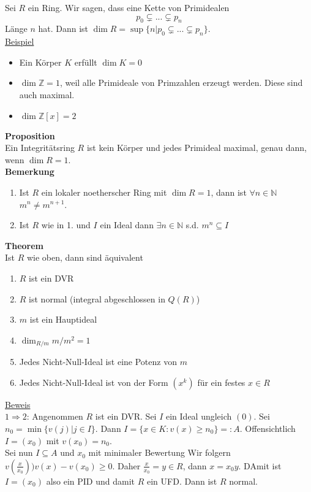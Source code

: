 \documentclass[a4paper, 12pt]{article}
\begin{document}
Sei $R$ ein Ring. Wir sagen, dass eine Kette von Primidealen \[p_0 \subsetneq ... \subsetneq p_n\]
Länge $n$ hat. Dann ist $\dim R = \sup\{n | p_0 \subsetneq ... \subsetneq p_n\}$.\\
\underline{Beispiel}
\begin{itemize}
	\item Ein Körper $K$ erfüllt $\dim K = 0$
	\item $\dim \mathbb{Z} = 1$, weil alle Primideale von Primzahlen erzeugt werden. Diese sind auch maximal.
	\item $\dim \mathbb{Z}[x] = 2$
\end{itemize}
\textbf{Proposition}\\
Ein Integritätsring $R$ ist kein Körper und jedes Primideal maximal, genau dann, wenn $\dim R = 1$.\\
\textbf{Bemerkung}
\begin{enumerate}
	\item Ist $R$ ein lokaler noetherscher Ring mit $\dim R = 1$, dann ist $\forall n \in \mathbb{N}$ $m^n \neq m^{n+1}$.
	\item Ist $R$ wie in 1. und $I$ ein Ideal dann $\exists n \in \mathbb{N}$ s.d. $m^n \subseteq I$
\end{enumerate}
\textbf{Theorem}\\
Ist $R$ wie oben, dann sind äquivalent \begin{enumerate}
	\item $R$ ist ein DVR
	\item $R$ ist normal (integral abgeschlossen in $Q(R)$)
	\item $m$ ist ein Hauptideal
	\item $\dim_{R/m} m/m^2 = 1$
	\item Jedes Nicht-Null-Ideal ist eine Potenz von $m$
	\item Jedes Nicht-Null-Ideal ist von der Form $(x^k)$ für ein festes $x \in R$  
\end{enumerate}
\underline{Beweis}\\
$1 \Rightarrow 2$: Angenommen $R$ ist ein DVR. Sei $I$ ein Ideal ungleich $(0)$. Sei $n_0 = \min\{v(j) | j \in I\}$. Dann $I = \{x \in K: v(x) \geq n_0\} =: A$. Offensichtlich $I = (x_0)$ mit $v(x_0) = n_0$.\\
Sei nun $I \subseteq A$ und $x_0$ mit minimaler Bewertung Wir folgern $v(\frac{x}{x_0}) ) v(x) - v(x_0) \geq 0$. Daher $\frac{x}{x_0} = y \in R$, dann $x = x_0 y$. DAmit ist $I = (x_0)$ also ein PID und damit $R$ ein UFD. Dann ist $R$ normal.\\
\end{document}
